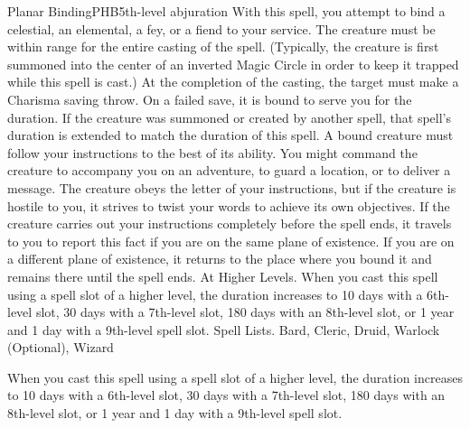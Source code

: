 \begin{spell}{Planar Binding}{PHB}{5th-level abjuration}
{
}
With this spell, you attempt to bind a celestial, an elemental, a fey, or a fiend to your service. The creature must be within range for the entire casting of the spell. (Typically, the creature is first summoned into the center of an inverted Magic Circle in order to keep it trapped while this spell is cast.) At the completion of the casting, the target must make a Charisma saving throw. On a failed save, it is bound to serve you for the duration. If the creature was summoned or created by another spell, that spell’s duration is extended to match the duration of this spell.
A bound creature must follow your instructions to the best of its ability. You might command the creature to accompany you on an adventure, to guard a location, or to deliver a message. The creature obeys the letter of your instructions, but if the creature is hostile to you, it strives to twist your words to achieve its own objectives. If the creature carries out your instructions completely before the spell ends, it travels to you to report this fact if you are on the same plane of existence. If you are on a different plane of existence, it returns to the place where you bound it and remains there until the spell ends.
At Higher Levels. When you cast this spell using a spell slot of a higher level, the duration increases to 10 days with a 6th-level slot, 30 days with a 7th-level slot, 180 days with an 8th-level slot, or 1 year and 1 day with a 9th-level spell slot.
Spell Lists. Bard, Cleric, Druid, Warlock (Optional), Wizard

 When you cast this spell using a spell slot of a higher level, the duration increases to 10 days with a 6th-level slot, 30 days with a 7th-level slot, 180 days with an 8th-level slot, or 1 year and 1 day with a 9th-level spell slot.
\end{spell}

